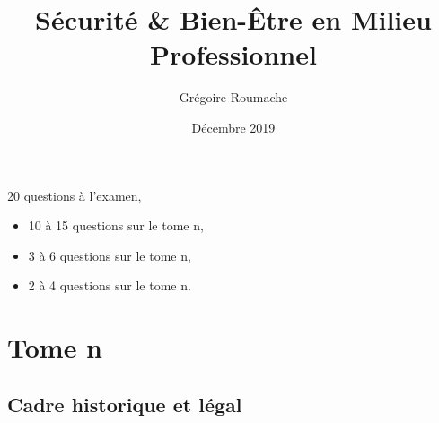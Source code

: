 \documentclass[a4paper]{article}
\title{Sécurité \& Bien-Être en Milieu Professionnel}
\author{Grégoire Roumache}
\date{Décembre 2019}
\begin{document}
\maketitle





20 questions à l'examen,
\begin{itemize}
    \item 10 à 15 questions sur le tome n,
    \item 3 à 6 questions sur le tome n,
    \item 2 à 4 questions sur le tome n.
\end{itemize}










\section{Tome n}










\subsection{Cadre historique et légal}
\end{document}
